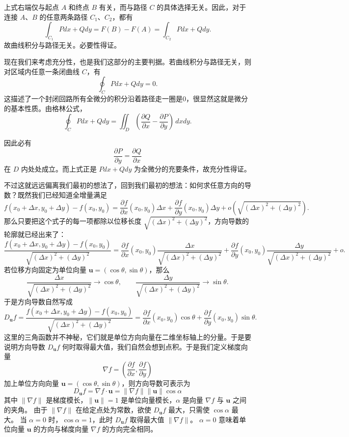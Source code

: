 \documentclass[UTF8]{ctexbook}
\begin{document}
上式右端仅与起点 $A$ 和终点 $B$ 有关，而与路径 $C$ 的具体选择无关。因此，对于连接 $A$、$B$ 的任意两条路径 $C_1$、$C_2$，都有
\[
\int_{C_1} Pdx+Qdy=F(B)-F(A)=\int_{C_2} Pdx+Qdy.
\]
故曲线积分与路径无关。必要性得证。

现在我们来考虑充分性，也是我们这部分的主要判据。若曲线积分与路径无关，则对区域内任意一条闭曲线 $C$，有
\[
\oint_C Pdx+Qdy=0.
\]
这描述了一个封闭回路所有全微分的积分沿着路径走一圈是$0$，很显然这就是微分的基本性质。由格林公式，
\[
\oint_C Pdx+Qdy
=\iint_D \left(\frac{\partial Q}{\partial x}-\frac{\partial P}{\partial y}\right)\,dxdy.
\]

因此必有
\[
\frac{\partial P}{\partial y}=\frac{\partial Q}{\partial x}
\]
在 $D$ 内处处成立。而上式正是 $Pdx+Qdy$ 为全微分的充要条件，故充分性得证。

不过这就远远偏离我们最初的想法了，回到我们最初的想法：如何求任意方向的导数\label{directional_derivative}？既然我们已经知道全增量满足
\[
f(x_0+\Delta x,y_0+\Delta y)-f(x_0,y_0)
=\frac{\partial f}{\partial x}(x_0,y_0)\Delta x+\frac{\partial f}{\partial y}(x_0,y_0)\Delta y +o\!\left(\sqrt{(\Delta x)^2+(\Delta y)^2}\right)
.
\]
那么只要把这个式子的每一项都除以位移长度 $\sqrt{(\Delta x)^2+(\Delta y)^2}$，方向导数的轮廓就已经出来了：
\[
\frac{f(x_0+\Delta x,y_0+\Delta y)-f(x_0,y_0)}{\sqrt{(\Delta x)^2+(\Delta y)^2}}
=\frac{\partial f}{\partial x}(x_0,y_0)\frac{\Delta x}{\sqrt{(\Delta x)^2+(\Delta y)^2}}
+\frac{\partial f}{\partial y}(x_0,y_0)\frac{\Delta y}{\sqrt{(\Delta x)^2+(\Delta y)^2}}
+o.
\]
若位移方向固定为单位向量 $\mathbf u=(\cos\theta,\sin\theta)$，那么
\[
\frac{\Delta x}{\sqrt{(\Delta x)^2+(\Delta y)^2}}\to \cos\theta,
\qquad
\frac{\Delta y}{\sqrt{(\Delta x)^2+(\Delta y)^2}}\to \sin\theta.
\]
于是方向导数自然写成
\[
 D_{\mathbf{u}}f=\frac{f(x_0+\Delta x,y_0+\Delta y)-f(x_0,y_0)}{\sqrt{(\Delta x)^2+(\Delta y)^2}}
=\frac{\partial f}{\partial x}(x_0,y_0)\cos\theta
+\frac{\partial f}{\partial y}(x_0,y_0)\sin\theta.
\]
这里的三角函数并不神秘，它们就是单位方向向量在二维坐标轴上的分量。于是要说明方向导数 $D_{\mathbf{u}}f$ 何时取得最大值，我们自然会想到点积。于是我们定义梯度向量
\[\nabla f = \left( \frac{\partial f}{\partial x}, \frac{\partial f}{\partial y} \right)
\]
加上单位方向向量 $\mathbf{u} = (\cos\theta, \sin\theta)$，则方向导数可表示为
\[
        D_{\mathbf{u}}f = \nabla f \cdot \mathbf{u} = \|\nabla f\| \|\mathbf{u}\| \cos\alpha
\]
其中 $\|\nabla f\|$ 是梯度模长，$\|\mathbf{u}\|=1$ 是单位向量模长，$\alpha$ 是向量 $\nabla f$ 与 $\mathbf{u}$ 之间的夹角。
由于 $\|\nabla f\|$ 在给定点处为常数，欲使 $D_{\mathbf{u}}f$ 最大，只需使 $\cos\alpha$ 最大。
当 $\alpha = 0$ 时，$\cos\alpha = 1$，此时 $D_{\mathbf{u}}f$ 取得最大值 $\|\nabla f\|$。
$\alpha = 0$ 意味着单位向量 $\mathbf{u}$ 的方向与梯度向量 $\nabla f$ 的方向完全相同。
   
\end{document}
